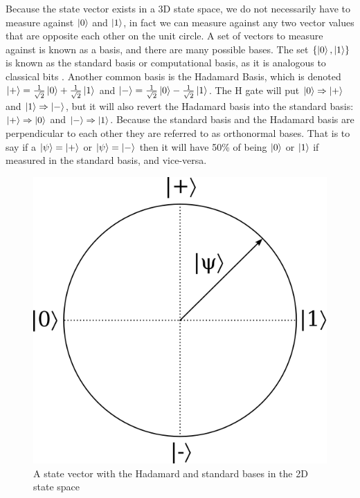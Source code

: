 Because the state vector exists in a 3D state space, we do not necessarily have to measure against $\ket{0}$ and $\ket{1}$, in fact we can measure against any two vector values that are opposite each other on the unit circle. 
A set of vectors to measure against is known as a basis, and there are many possible bases. 
The set $\{\ket{0},\ket{1}\}$ is known as the standard basis or computational basis, as it is analogous to classical bits \cite{qcftgu}.
Another common basis is the Hadamard Basis, which is denoted $\ket{+} = \frac{1}{\sqrt{2}}\ket{0} + \frac{1}{\sqrt{2}}\ket{1}$ and $\ket{-} = \frac{1}{\sqrt{2}}\ket{0} - \frac{1}{\sqrt{2}}\ket{1}$.
The H gate will put $\ket{0} \Rightarrow \ket{+}$ and $\ket{1} \Rightarrow \ket{-}$, but it will also revert the Hadamard basis into the standard basis: $\ket{+} \Rightarrow \ket{0}$ and $\ket{-} \Rightarrow \ket{1}$.
Because the standard basis and the Hadamard basis are perpendicular to each other they are referred to as orthonormal bases.
That is to say if a $\ket{\psi} = \ket{+}$ or $\ket{\psi} = \ket{-}$ then it will have 50\% of being $\ket{0}$ or $\ket{1}$ if measured in the standard basis, and vice-versa. 

\begin{figure}[htp]
\centering
\includegraphics[scale=0.25]{images/orthonormal_basis.png}
\caption{A state vector with the Hadamard and standard bases in the 2D state space}
\label{}
\end{figure}

